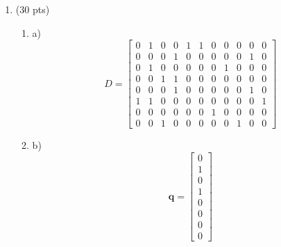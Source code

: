 \documentclass[11pt]{article}
\begin{document}

 \begin{enumerate}



    \item \label{Problem_01} (30 pts)


      \begin{enumerate}
      
        \item a)
        $$ D = 
        \begin{bmatrix} 
        0 & 1 & 0 & 0 & 1 & 1 & 0 & 0 & 0 & 0 & 0 \\
        0 & 0 & 0 & 1 & 0 & 0 & 0 & 0 & 0 & 1 & 0 \\
        0 & 1 & 0 & 0 & 0 & 0 & 0 & 1 & 0 & 0 & 0 \\
        0 & 0 & 1 & 1 & 0 & 0 & 0 & 0 & 0 & 0 & 0 \\
        0 & 0 & 0 & 1 & 0 & 0 & 0 & 0 & 0 & 1 & 0 \\
        1 & 1 & 0 & 0 & 0 & 0 & 0 & 0 & 0 & 0 & 1 \\
        0 & 0 & 0 & 0 & 0 & 0 & 1 & 0 & 0 & 0 & 0 \\
        0 & 0 & 1 & 0 & 0 & 0 & 0 & 0 & 1 & 0 & 0 
        \end{bmatrix}$$
        
        \vskip 06pt
        \item b)
        $$\mathbf{q} = \begin{bmatrix} 0 \\ 1 \\ 0 \\ 1 \\ 0 \\ 0 \\ 0 \\ 0 \end{bmatrix}$$


\end{enumerate}
\end{enumerate}
\end{document}
